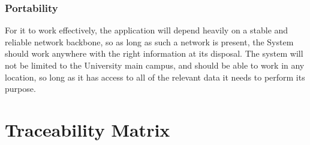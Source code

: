 \documentclass[12pt]{article}
\begin{document}
		\subsubsection{Portability}
		For it to work effectively, the application will depend heavily on a stable and reliable network backbone, so as long as such a network is present, the System should work anywhere with the right information at its disposal.  The system will not be limited to the University main campus, and should be able to work in any location, so long as it has access to all of the relevant data it needs to perform its purpose.  
		
	
\section{Traceability Matrix}
\end{document}
